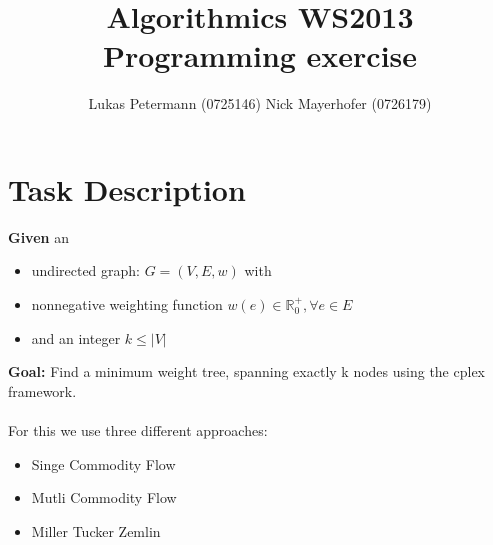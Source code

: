 \documentclass[a4paper,11pt]{article}
\title{Algorithmics WS2013 Programming exercise}
\author{Lukas Petermann (0725146) \quad Nick Mayerhofer (0726179)}
\begin{document}
\maketitle
\tableofcontents

\newpage
\section{Task Description}
\textbf{Given} an 
\begin{itemize}
  \item undirected graph: $G=(V,E,w)$ with
  \item nonnegative weighting function $ w(e) \in \mathbb{R}_0^+ , \forall e \in E$
  \item and an integer $k \leq |V|$
\end{itemize}

\textbf{Goal:}
Find a minimum weight tree, spanning exactly k nodes using the cplex framework.\\
\\
For this we use three different approaches:
\begin{itemize}
  \item Singe Commodity Flow
  \item Mutli Commodity Flow
  \item Miller Tucker Zemlin
\end{itemize}






\end{document}
